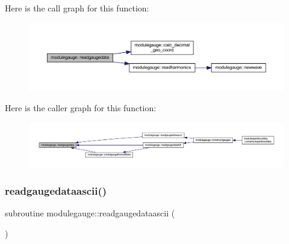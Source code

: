 Here is the call graph for this function\+:\nopagebreak
\begin{figure}[H]
\begin{center}
\leavevmode
\includegraphics[width=350pt]{namespacemodulegauge_a6be887d8098d9844b158ef75048c3473_cgraph}
\end{center}
\end{figure}
Here is the caller graph for this function\+:\nopagebreak
\begin{figure}[H]
\begin{center}
\leavevmode
\includegraphics[width=350pt]{namespacemodulegauge_a6be887d8098d9844b158ef75048c3473_icgraph}
\end{center}
\end{figure}
\mbox{\label{namespacemodulegauge_a6f6a7638c9e37ab7f5461866ec475f03}} 
\subsubsection{\texorpdfstring{readgaugedataascii()}{readgaugedataascii()}}
{\footnotesize\ttfamily subroutine modulegauge\+::readgaugedataascii (\begin{DoxyParamCaption}{ }\end{DoxyParamCaption})\hspace{0.3cm}{\ttfamily [private]}}


